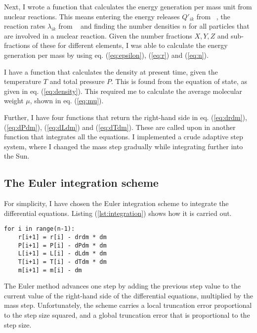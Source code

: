 \documentclass[a4paper, 11pt, english]{article}
\newcommand{\refeq}[1]{(\textcolor{red}{\ref{eq:#1}})} %
\newcommand{\reflst}[1]{(\textcolor{red}{\ref{lst:#1}})}
\begin{document}
Next, I wrote a function that calculates the energy generation per mass unit from nuclear
reactions. This means entering the energy releases $Q'_{ik}$ from ~\cite[p.~39,
Table~2.1]{stix}, the reaction rates $\lambda_{ik}$ from ~\cite[p.~46,
Table~2.3]{stix} and finding the number densities $n$ for all particles that are involved
in a nuclear reaction. Given the number fractions $X,Y,Z$ and sub-fractions of these
for different elements, I was able to calculate the energy generation per mass by using
eq. \refeq{epsilon}, \refeq{r} and \refeq{n}.

I have a function that calculates the density at present time, given the temperature
$T$ and total pressure $P$. This is found from the equation of state, as given in eq.
\refeq{density}. This required me to calculate the average molecular weight $\mu$,
shown in eq. \refeq{mu}.

Further, I have four functions that return the right-hand side in eq. \refeq{drdm},
\refeq{dPdm}, \refeq{dLdm} and \refeq{dTdm}. These are called upon in another function
that integrates all the equations. I implemented a crude adaptive step system, where I
changed the mass step gradually while integrating further into the Sun.

\subsection{The Euler integration scheme}

For simplicity, I have chosen the Euler integration scheme to integrate the differential
equations. Listing \reflst{integration} shows how it is carried out.
\belowcaptionskip=-10pt
\begin{lstlisting}[label=lst:integration,caption=Euler integration loop]	
for i in range(n-1):
	r[i+1] = r[i] - drdm * dm
	P[i+1] = P[i] - dPdm * dm
	L[i+1] = L[i] - dLdm * dm
	T[i+1] = T[i] - dTdm * dm
	m[i+1] = m[i] - dm
\end{lstlisting}
The Euler method advances one step by adding the previous step value to the current value
of the right-hand side of the differential equations, multiplied by the mass step.
Unfortunately, the scheme carries a local truncation error proportional to the step size
squared, and a global truncation error that is proportional to the step size.
\end{document}

